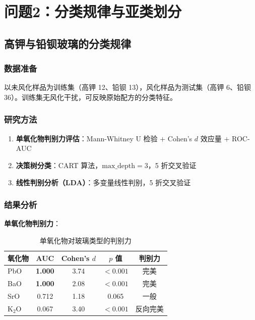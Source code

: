 \section{问题2：分类规律与亚类划分}

\subsection{高钾与铅钡玻璃的分类规律}

\subsubsection{数据准备}

以未风化样品为训练集（高钾 12、铅钡 13），风化样品为测试集（高钾 6、铅钡 36）。训练集无风化干扰，可反映原始配方的分类特征。

\subsubsection{研究方法}

\begin{enumerate}[label=(\arabic*)]
    \item \textbf{单氧化物判别力评估}：Mann-Whitney U 检验 $+$ Cohen's $d$ 效应量 $+$ ROC-AUC
    \item \textbf{决策树分类}：CART 算法，$\text{max\_depth} = 3$，5 折交叉验证
    \item \textbf{线性判别分析（LDA）}：多变量线性判别，5 折交叉验证
\end{enumerate}

\subsubsection{结果分析}

\textbf{单氧化物判别力}：

\begin{table}[H]
    \centering
    \caption{单氧化物对玻璃类型的判别力}
    \label{tab:oxide_discrimination}
    \begin{tabular}{l c c c c}
        \toprule
        \textbf{氧化物} & \textbf{AUC} & \textbf{Cohen's $d$} & \textbf{$p$ 值} & \textbf{判别力} \\
        \midrule
        PbO & \textbf{1.000} & 3.74 & $< 0.001$ & 完美 \\
        BaO & \textbf{1.000} & 2.08 & $< 0.001$ & 完美 \\
        SrO & 0.712 & 1.18 & 0.065 & 一般 \\
        $\text{K}_2\text{O}$ & 0.067 & 3.40 & $< 0.001$ & 反向完美 \\
        \bottomrule
    \end{tabular}
\end{table}


